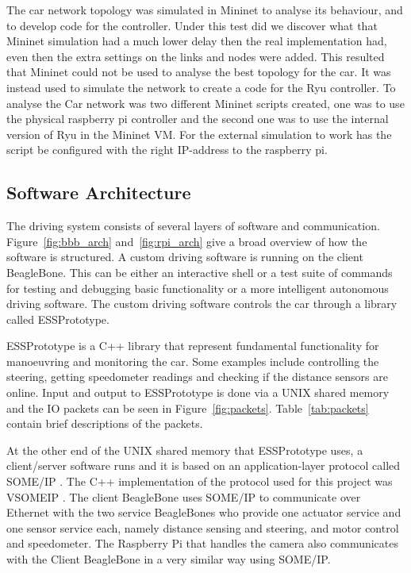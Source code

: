 \documentclass[11pt, titlepage]{article} %
\begin{document}
The car network topology was simulated in Mininet to analyse its behaviour, and to develop code for the controller. Under this test did we discover what that Mininet simulation had a much lower delay then the real implementation had, even then the extra settings on the links and nodes were added. This resulted that Mininet could not be used to analyse the best topology for the car. It was instead used to simulate the network to create a code for the Ryu controller. To analyse the Car network was two different Mininet scripts created, one was to use the physical raspberry pi controller and the second one was to use the internal version of Ryu in the Mininet VM. For the external simulation to work has the script be configured with the right IP-address to the raspberry pi. 

\subsection{Software Architecture}
The driving system consists of several layers of software and communication.
Figure~\ref{fig:bbb_arch} and~\ref{fig:rpi_arch} give a broad overview
of how the software is structured. A custom driving software is running on the
client BeagleBone. This can be either an interactive shell or a test suite of commands
for testing and debugging basic functionality or a more intelligent autonomous
driving software. The custom driving software controls the car through a library
called ESSPrototype.

ESSPrototype is a C++ library that represent fundamental functionality for manoeuvring and monitoring
the car. Some examples include controlling the steering, getting speedometer readings and checking if the distance sensors are online.
Input and output to ESSPrototype is done via a UNIX shared memory and the IO packets can be seen in Figure~\ref{fig:packets}. Table~\ref{tab:packets}
contain brief descriptions of the packets.

At the other end of the UNIX shared memory that ESSPrototype uses, a client/server software
runs and it is based on an application-layer protocol called SOME/IP \cite{someip}. The C++ implementation of the 
protocol used for this project was VSOMEIP \cite{vsomeip}. The client BeagleBone uses SOME/IP to communicate over
Ethernet with the two service BeagleBones who provide one actuator service and one sensor service each, namely
distance sensing and steering, and motor control and speedometer. The Raspberry Pi that handles the camera
also communicates with the Client BeagleBone in a very similar way using SOME/IP.
\end{document}
